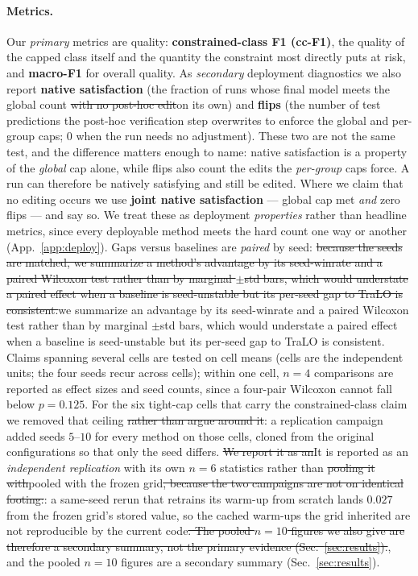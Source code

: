 \documentclass[10pt]{article}
\newcommand{\del}[1]{{\color{red}\sout{#1}}}
\begin{document}
\paragraph{Metrics.}
Our \emph{primary} metrics are quality: \textbf{constrained-class F1
(cc-F1)}, the quality of the capped class itself and the quantity the
constraint most directly puts at risk, and \textbf{macro-F1} for overall
quality. As \emph{secondary} deployment diagnostics we also report
\textbf{native satisfaction} (the fraction of runs whose final model meets
the global count \del{with no post-hoc edit}{\color{blue}on its own}) and
\textbf{flips} (the number of
test predictions the post-hoc verification step overwrites to enforce the
global and per-group caps; $0$ when the run needs no adjustment).
{\color{blue}These two are not the same test, and the difference matters enough
to name: native satisfaction is a property of the \emph{global} cap alone, while
flips also count the edits the \emph{per-group} caps force. A run can therefore
be natively satisfying and still be edited. Where we claim that no editing
occurs we use \textbf{joint native satisfaction} --- global cap met \emph{and}
zero flips --- and say so.} We treat
these as deployment \emph{properties} rather than headline metrics, since
every deployable method meets the hard count one way or another
(App.~\ref{app:deploy}). Gaps versus baselines are \emph{paired} by seed:
\del{because the seeds are matched, we summarize a method's advantage by its
seed-winrate and a paired Wilcoxon test rather than by marginal $\pm$std
bars, which would understate a paired effect when a baseline is
seed-unstable but its per-seed gap to TraLO is consistent.}{\color{blue}we
summarize an advantage by its seed-winrate and a paired Wilcoxon test rather
than by marginal $\pm$std bars, which would understate a paired effect when a
baseline is seed-unstable but its per-seed gap to TraLO is consistent.} Claims spanning
several cells are tested on cell means (cells are the independent units;
the four seeds recur across cells); within one cell, $n{=}4$ comparisons
are reported as effect sizes and seed counts, since a four-pair Wilcoxon
cannot fall below $p{=}0.125$.{\color{blue} For the six tight-cap cells that
carry the constrained-class claim we removed that ceiling \del{rather than argue
around it}: a replication campaign added seeds $5$--$10$ for every method on
those cells, cloned from the original configurations so that only the seed
differs. \del{We report it as an}{It is reported as an} \emph{independent replication} with its own $n{=}6$
statistics rather than \del{pooling it with}{pooled with} the frozen grid\del{, because the two
campaigns are not on identical footing:}{:} a same-seed rerun that retrains its
warm-up from scratch lands $0.027$ from the frozen grid's stored value, so the
cached warm-ups the grid inherited are not reproducible by the current code\del{.
The pooled \mbox{$n{=}10$} figures we also give are therefore a secondary summary, not
the primary evidence \mbox{(Sec.~\ref{sec:results})}.}{, and the pooled $n{=}10$ figures
are a secondary summary (Sec.~\ref{sec:results}).}}
\end{document}
